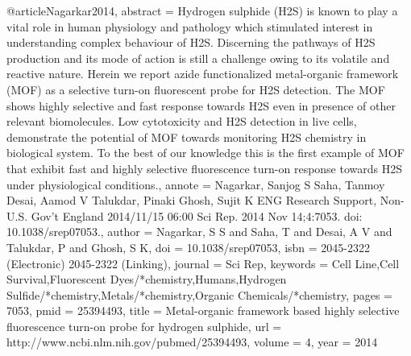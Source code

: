 @article{Nagarkar2014,
abstract = {Hydrogen sulphide (H2S) is known to play a vital role in human physiology and pathology which stimulated interest in understanding complex behaviour of H2S. Discerning the pathways of H2S production and its mode of action is still a challenge owing to its volatile and reactive nature. Herein we report azide functionalized metal-organic framework (MOF) as a selective turn-on fluorescent probe for H2S detection. The MOF shows highly selective and fast response towards H2S even in presence of other relevant biomolecules. Low cytotoxicity and H2S detection in live cells, demonstrate the potential of MOF towards monitoring H2S chemistry in biological system. To the best of our knowledge this is the first example of MOF that exhibit fast and highly selective fluorescence turn-on response towards H2S under physiological conditions.},
annote = {Nagarkar, Sanjog S
Saha, Tanmoy
Desai, Aamod V
Talukdar, Pinaki
Ghosh, Sujit K
ENG
Research Support, Non-U.S. Gov't
England
2014/11/15 06:00
Sci Rep. 2014 Nov 14;4:7053. doi: 10.1038/srep07053.},
author = {Nagarkar, S S and Saha, T and Desai, A V and Talukdar, P and Ghosh, S K},
doi = {10.1038/srep07053},
isbn = {2045-2322 (Electronic)
2045-2322 (Linking)},
journal = {Sci Rep},
keywords = {Cell Line,Cell Survival,Fluorescent Dyes/*chemistry,Humans,Hydrogen Sulfide/*chemistry,Metals/*chemistry,Organic Chemicals/*chemistry},
pages = {7053},
pmid = {25394493},
title = {{Metal-organic framework based highly selective fluorescence turn-on probe for hydrogen sulphide}},
url = {http://www.ncbi.nlm.nih.gov/pubmed/25394493},
volume = {4},
year = {2014}
}
